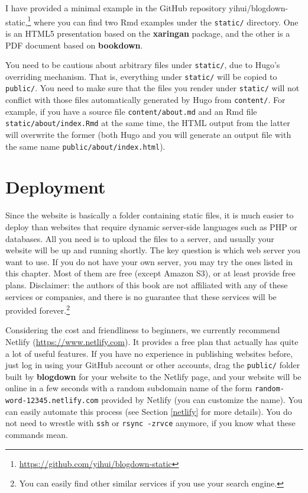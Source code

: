 \documentclass[12pt,]{krantz}
\renewcommand{\href}[2]{#2\footnote{\url{#1}}}
\theoremstyle{definition}
\theoremstyle{definition}
\theoremstyle{definition}
\theoremstyle{remark}
\begin{document}
I have provided a minimal example in the GitHub repository
\href{https://github.com/yihui/blogdown-static}{yihui/blogdown-static,}
where you can find two Rmd examples under the \texttt{static/}
directory. One is an HTML5 presentation based on the \textbf{xaringan}
package, and the other is a PDF document based on \textbf{bookdown}.

You need to be cautious about arbitrary files under \texttt{static/},
due to Hugo's overriding mechanism. That is, everything under
\texttt{static/} will be copied to \texttt{public/}. You need to make
sure that the files you render under \texttt{static/} will not conflict
with those files automatically generated by Hugo from \texttt{content/}.
For example, if you have a source file \texttt{content/about.md} and an
Rmd file \texttt{static/about/index.Rmd} at the same time, the HTML
output from the latter will overwrite the former (both Hugo and you will
generate an output file with the same name
\texttt{public/about/index.html}).

\hypertarget{deployment}{%
\chapter{Deployment}\label{deployment}}

Since the website is basically a folder containing static files, it is
much easier to deploy than websites that require dynamic server-side
languages such as PHP or databases. All you need is to upload the files
to a server, and usually your website will be up and running shortly.
The key question is which web server you want to use. If you do not have
your own server, you may try the ones listed in this chapter. Most of
them are free (except Amazon S3), or at least provide free plans.
Disclaimer: the authors of this book are not affiliated with any of
these services or companies, and there is no guarantee that these
services will be provided forever.\footnote{You can easily find other
  similar services if you use your search engine.}

Considering the cost and friendliness to beginners, we currently
recommend Netlify (\url{https://www.netlify.com}). It provides a free
plan that actually has quite a lot of useful features. If you have no
experience in publishing websites before, just log in using your GitHub
account or other accounts, drag the \texttt{public/} folder built by
\textbf{blogdown} for your website to the Netlify page, and your website
will be online in a few seconds with a random subdomain name of the form
\texttt{random-word-12345.netlify.com} provided by Netlify (you can
customize the name). You can easily automate this process (see Section
\ref{netlify} for more details). You do not need to wrestle with
\texttt{ssh} or \texttt{rsync\ -zrvce} anymore, if you know what these
commands mean.
\end{document}

